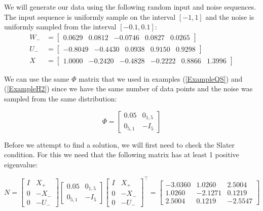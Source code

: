 We will generate our data using the following random input and noise sequences. The input sequence is uniformly sample on the interval $[-1,1]$ and the noise is uniformly sampled from the interval $[-0.1, 0.1]$:
\begin{align*}
	W_- &= \begin{bmatrix}  0.0629 &   0.0812 &  -0.0746 &   0.0827 &   0.0265 \end{bmatrix} \\
	U_- &= \begin{bmatrix} -0.8049 &  -0.4430 &   0.0938 &   0.9150 &   0.9298 \end{bmatrix} \\
	X   &= \begin{bmatrix}  1.0000 &  -0.2420 &  -0.4828 &  -0.2222 &   0.8866  &  1.3996 \end{bmatrix}
\end{align*}

We can use the same $\Phi$ matrix that we used in examples (\ref{ExampleQS}) and (\ref{ExampleH2}) since we have the same number of data points and the noise was sampled from the same distribution:

\begin{equation*}
\Phi = \begin{bmatrix} 0.05 & 0_{1,5} \\ 0_{5,1} & -I_5 \end{bmatrix}
\end{equation*}

Before we attempt to find a solution, we will first need to check the Slater condition. For this we need that the following matrix has at least 1 positive eigenvalue:

\begin{equation*}
N = 
\begin{bmatrix} I&X_+ \\ 0 & -X_- \\ 0&-U_- \end{bmatrix}
\begin{bmatrix} 0.05 & 0_{1,5} \\ 0_{5,1} & -I_5 \end{bmatrix}
\begin{bmatrix} I&X_+ \\ 0 & -X_- \\ 0&-U_- \end{bmatrix}^\top 
=
\begin{bmatrix} 
	-3.0360 &   1.0260 &   2.5004 \\
 	 1.0260 &  -2.1271 &   0.1219 \\
 	 2.5004 &   0.1219 &  -2.5547
\end{bmatrix} 
\end{equation*}

